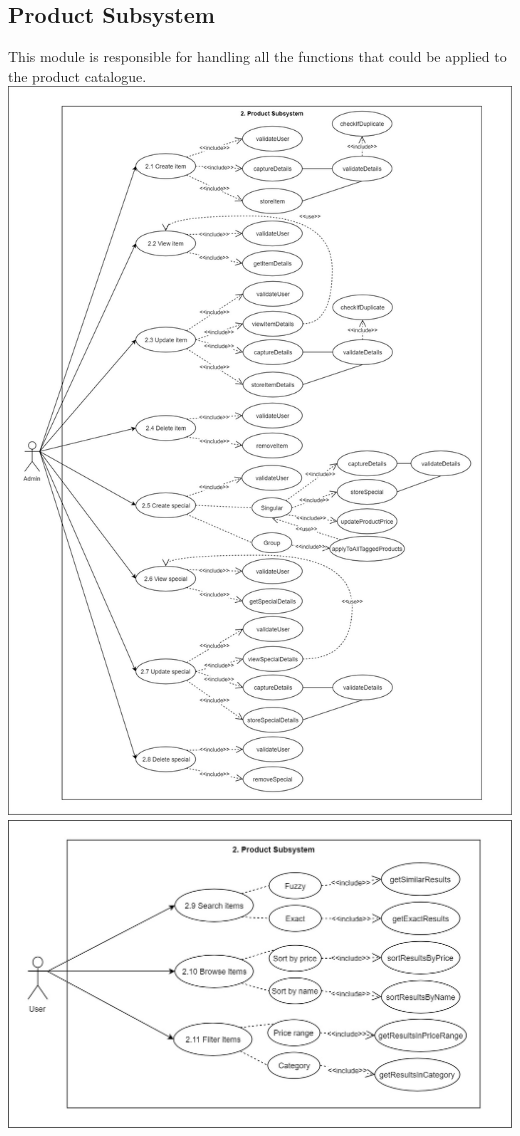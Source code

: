 \documentclass[a4paper,10pt]{article}
\begin{document}
\subsection{Product Subsystem}
This module is responsible for handling all the functions that could be applied to the product catalogue.
\includegraphics[scale=0.3]{Product_Subsystem_Use_Case.jpg}
\newpage
\clearpage
\includegraphics[scale=0.3]{Product_Subsystem_Use_Case_2.jpg}
\end{document}
